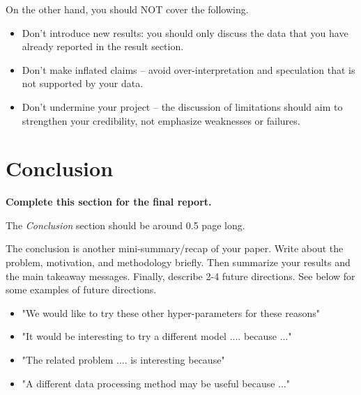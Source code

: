 \documentclass[letterpaper]{article} %
\begin{document}
On the other hand, you should NOT cover the following.

\begin{itemize}
    \item Don’t introduce new results: you should only discuss the data that you have already reported in the result section.  
    \item Don’t make inflated claims – avoid over-interpretation and speculation that is not supported by your data.
    \item Don’t undermine your project – the discussion of limitations should aim to strengthen your credibility, not emphasize weaknesses or failures.
\end{itemize}


\section{Conclusion}

{\bf Complete this section for the final report.}

The {\em Conclusion} section should be around 0.5 page long.

The conclusion is another mini-summary/recap of your paper. Write about the problem, motivation, and methodology briefly. Then summarize your results and the main takeaway messages. Finally, describe 2-4 future directions. See below for some examples of future directions.

\begin{itemize}
    \item "We would like to try these other hyper-parameters for these reasons"
    \item "It would be interesting to try a different model .... because ..."
    \item "The related problem .... is interesting because"
    \item "A different data processing method may be useful because ..."
\end{itemize}

\newpage


\end{document}
